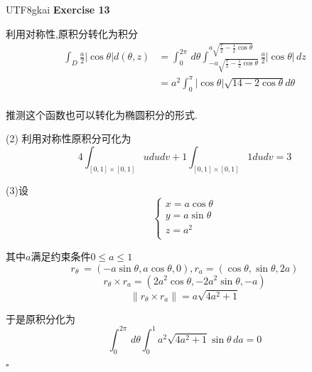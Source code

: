 \documentclass[11pt,hyperref,a4paper,UTF8]{ctexart}
\newenvironment{exercise}[1]{%
{\textbf{Exercise #1} \\ 
    }
}{
  \hfill $\square$ 
  \par\bigskip 
}
\newcommand{\parameter}[1]{\left(#1\right)}
\begin{document}
\begin{CJK}{UTF8}{gkai}
\begin{exercise}{13}
    利用对称性,原积分转化为积分
    \[
    \begin{aligned}
        \int_D \frac{a}{2}|\cos \theta| d(\theta,z)
        &=\int_{0}^{2\pi}\, d\theta \int_{- a \sqrt{\frac{7}{2} - \frac{1}{2}\cos \theta}}^{a \sqrt{\frac{7}{2} - \frac{1}{2}\cos \theta}} \frac{a}{2}|\cos \theta| \, dz\\
        &= a^2 \int_{0}^{\pi} |\cos \theta| \sqrt{14 - 2\cos \theta} d\theta\\ 
    \end{aligned}    
    \]

    推测这个函数也可以转化为椭圆积分的形式.

    (2)
    利用对称性原积分可化为
    \[4\int_{[0,1]\times[0,1]}u du dv + 1 \int_{[0,1]\times[0,1]} 1 du dv = 3\]

    (3)设
    \[\begin{cases}
        x = a\cos \theta\\
        y = a\sin \theta\\
        z = a^2\\
    \end{cases}\]

    其中$a$满足约束条件$0\leq a \leq 1$
    \[r_\theta\ = (-a\sin\theta,a\cos\theta,0),r_a = (\cos\theta,\sin\theta,2a)\]
    \[r_\theta \times r_a = (2a^2 \cos\theta,-2a^2 \sin\theta,-a)\]
    \[\|r_\theta \times r_a\| = a\sqrt{4a^2 + 1} \]

    于是原积分化为
    \[\int_{0}^{2\pi}\,d\theta \int_{0}^{1} a^2\sqrt{4a^2 + 1} \sin \theta\,da = 0\]
\end{exercise}
\end{CJK}
\end{document}
